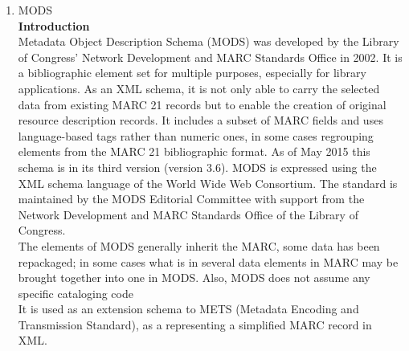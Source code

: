 \begin{enumerate}
	\item MODS\\
	{\bf Introduction}\\
    Metadata Object Description Schema (MODS) was developed by the Library of Congress' Network Development and MARC Standards Office in 2002. It is a bibliographic element set for multiple purposes, especially for library applications. As an XML schema, it is not only able to carry the selected data from existing MARC 21 records but to enable the creation of original resource description records. It includes a subset of MARC fields and uses language-based tags rather than numeric ones, in some cases regrouping elements from the MARC 21 bibliographic format. As of May 2015 this schema is in its third version (version 3.6). MODS is expressed using the XML schema language of the World Wide Web Consortium. The standard is maintained by the MODS Editorial Committee with support from the Network Development and MARC Standards Office of the Library of Congress.\\
	
	The elements of MODS generally inherit the MARC, some data has been repackaged; in some cases what is in several data elements in MARC may be brought together into one in MODS. Also, MODS does not assume any specific cataloging code\\ It is used as an extension schema to METS (Metadata Encoding and Transmission Standard), as a representing a simplified MARC record in XML.
	

\end{enumerate}
